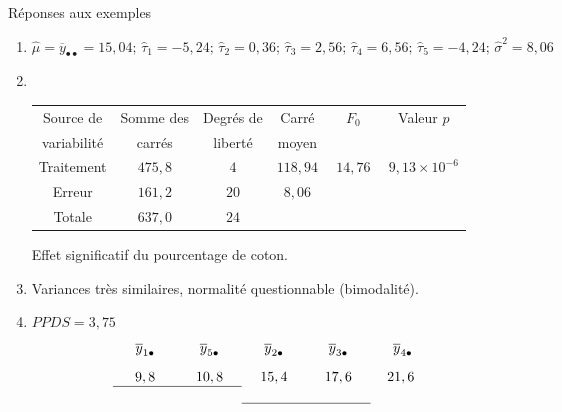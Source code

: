\documentclass{BeamerTemplate}
\begin{document}
\begin{frame}[t]{Réponses aux exemples}

{\scriptsize

\begin{enumerate}
  \item  $\hat\mu=\overline y_{\bullet\bullet}=15,04;\, \hat\tau_1=-5,24;\, \hat\tau_2=0,36;\, \hat\tau_3=2,56;\, \hat\tau_4=6,56;\, \hat\tau_5=-4,24;\,\hat\sigma^2=8,06$
 \item $\mbox{ }$

 \begin{tabular}{cccccc}\hline
Source de & Somme des & Degrés de & Carré & $\quad F_0\quad $ & Valeur $p$ \\
variabilité & carrés & liberté & moyen & & \\ \hline
Traitement & $475,8$ & $4$ & $118,94$ & $14,76$ & $9,13\times 10^{-6}$\\
Erreur & $161,2$ & $20$ &$ 8,06$ & & \\\hline
Totale &$637,0$ &$24$ & & & \\\hline
\end{tabular}

      Effet significatif du pourcentage de coton.
 \item Variances très similaires, normalité questionnable (bimodalité).
 \item $PPDS=3,75$
  $$
\begin{array}{c c c c c}
\;\;\;\;\overline y_{1\bullet} \;\;\;\;&\;\;\;\; \overline
y_{5\bullet} \;\;\;\;& \;\;\;\;\overline y_{2\bullet} \;\;\;\;
&\;\;\;\;\overline y_{3\bullet} \;\;\;\;&\;\;\;\;
\overline y_{4\bullet} \;\;\;\;\\[.3cm]
9,8 & 10,8 & 15,4 & 17,6 & 21,6
\\ \cline{1-2}\\\cline{3-4}
\end{array}
$$
 \end{enumerate}

 }
\end{frame}
\end{document}

